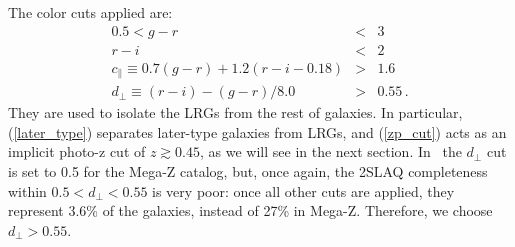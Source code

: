 The color cuts applied are: 
\begin{eqnarray}
0.5<g-r&<&3 \label{gr_isol_lrg}\\
r-i&<&2 \label{ri_isol_lrg}\\
c_\parallel \equiv 0.7(g-r)+1.2(r-i-0.18)&>&1.6 \label{later_type}\\
d_\perp \equiv (r-i)-(g-r)/8.0&>&0.55 \label{zp_cut} \, .
\end{eqnarray}
They are used to isolate the LRGs from the rest of galaxies. In particular, (\ref{later_type}) separates later-type galaxies from LRGs, and (\ref{zp_cut}) acts as an implicit photo-z cut of $z\gtrsim0.45$, as we will see in the next section.
In~\citet{Collister2007} the $d_\perp$ cut is set to 0.5 for the Mega-Z catalog, but, once again, the 2SLAQ completeness within $0.5<d_\perp<0.55$ is very poor: once all other cuts are applied, they represent 3.6\% of the galaxies, instead of 27\% in Mega-Z. Therefore, we choose $d_\perp > 0.55$.


